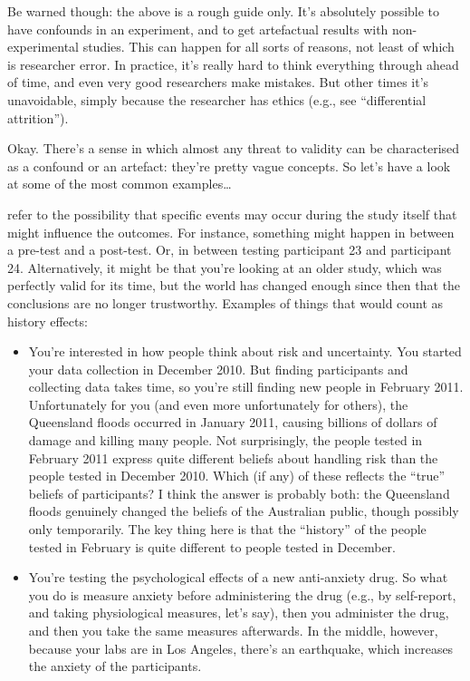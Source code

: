 Be warned though: the above is a rough guide only. It's absolutely possible to have confounds in an experiment, and to get artefactual results with non-experimental studies. This can happen for all sorts of reasons, not least of which is researcher error. In practice, it's really hard to think everything through ahead of time, and even very good researchers make mistakes. But other times it's unavoidable, simply because the researcher has ethics (e.g., see ``differential attrition''). 

Okay. There's a sense in which almost any threat to validity can be characterised as a confound or an artefact: they're pretty vague concepts. So let's have a look at some of the most common examples\ldots



 refer to the possibility that specific events may occur during the study itself that might influence the outcomes. For instance, something might happen in between a pre-test and a post-test. Or, in between testing participant 23 and participant 24. Alternatively, it might be that you're looking at an older study, which was perfectly valid for its time, but the world has changed enough since then that the conclusions are no longer trustworthy. Examples of things that would count as history effects:

\begin{itemize}
\item You're interested in how people think about risk and uncertainty. You started your data collection in December 2010. But finding participants and collecting data takes time, so you're still finding new people in February 2011. Unfortunately for you (and even more unfortunately for others), the Queensland floods occurred in January 2011, causing billions of dollars of damage and killing many people. Not surprisingly, the people tested in February 2011 express quite different beliefs about handling risk than the people tested in December 2010. Which (if any) of these reflects the ``true'' beliefs of participants? I think the answer is probably both: the Queensland floods genuinely changed the beliefs of the Australian public, though possibly only temporarily. The key thing here is that the ``history'' of the people tested in February is quite different to people tested in December. 
\item You're testing the psychological effects of a new anti-anxiety drug. So what you do is measure anxiety before administering the drug (e.g., by self-report, and taking physiological measures, let's say), then you administer the drug, and then you take the same measures afterwards. In the middle, however, because your labs are in Los Angeles, there's an earthquake, which increases the anxiety of the participants.  
\end{itemize}

